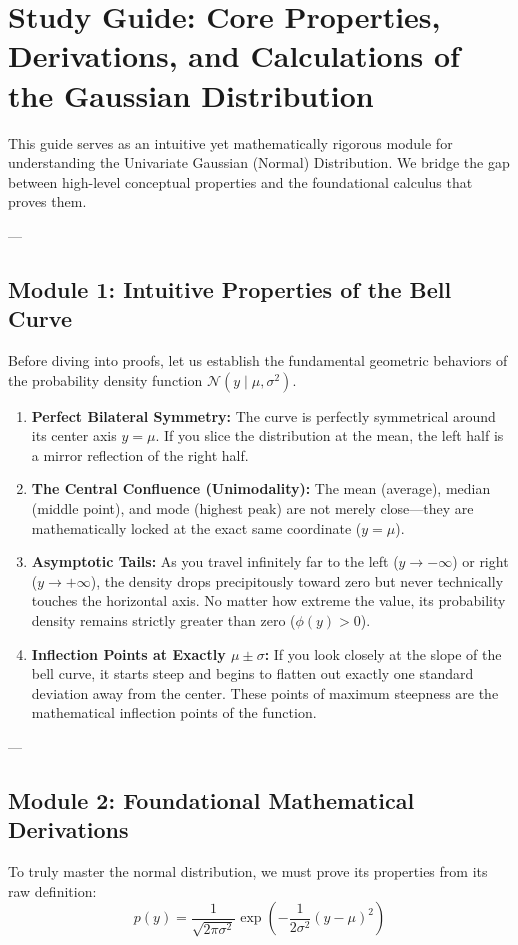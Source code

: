 \documentclass{article}
\begin{document}
\section*{Study Guide: Core Properties, Derivations, and Calculations of the Gaussian Distribution}

This guide serves as an intuitive yet mathematically rigorous module for understanding the Univariate Gaussian (Normal) Distribution. We bridge the gap between high-level conceptual properties and the foundational calculus that proves them.

---

\subsection*{Module 1: Intuitive Properties of the Bell Curve}
Before diving into proofs, let us establish the fundamental geometric behaviors of the probability density function $\mathcal{N}(y \mid \mu, \sigma^2)$.

\begin{enumerate}
    \item \textbf{Perfect Bilateral Symmetry:} The curve is perfectly symmetrical around its center axis $y = \mu$. If you slice the distribution at the mean, the left half is a mirror reflection of the right half.
    \item \textbf{The Central Confluence (Unimodality):} The mean (average), median (middle point), and mode (highest peak) are not merely close—they are mathematically locked at the exact same coordinate ($y = \mu$).
    \item \textbf{Asymptotic Tails:} As you travel infinitely far to the left ($y \to -\infty$) or right ($y \to +\infty$), the density drops precipitously toward zero but never technically touches the horizontal axis. No matter how extreme the value, its probability density remains strictly greater than zero ($\phi(y) > 0$).
    \item \textbf{Inflection Points at Exactly $\mu \pm \sigma$:} If you look closely at the slope of the bell curve, it starts steep and begins to flatten out exactly one standard deviation away from the center. These points of maximum steepness are the mathematical inflection points of the function.
\end{enumerate}

---

\subsection*{Module 2: Foundational Mathematical Derivations}
To truly master the normal distribution, we must prove its properties from its raw definition:
\begin{equation}
    p(y) = \frac{1}{\sqrt{2\pi\sigma^2}} \exp\left( -\frac{1}{2\sigma^2}(y - \mu)^2 \right)
\end{equation}
\end{document}
